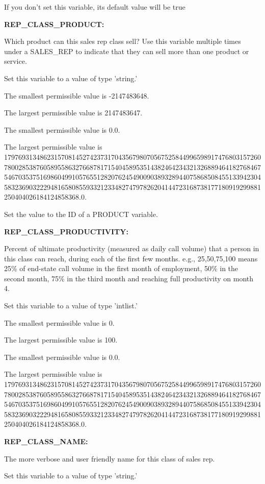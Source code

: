 If you don't set this variable, its default value will be true


\textbf{REP\_CLASS\_PRODUCT:}


Which product can this sales rep class sell?  Use this variable multiple times under a SALES\_REP to indicate that they can sell more than one product or service.

Set this variable to a value of type 'string.'

The smallest permissible value is -2147483648.

The largest permissible value is 2147483647.

The smallest permissible value is 0.0.

The largest permissible value is 179769313486231570814527423731704356798070567525844996598917476803157260780028538760589558632766878171540458953514382464234321326889464182768467546703537516986049910576551282076245490090389328944075868508455133942304583236903222948165808559332123348274797826204144723168738177180919299881250404026184124858368.0.

Set the value to the ID of a PRODUCT variable.


\textbf{REP\_CLASS\_PRODUCTIVITY:}


Percent of ultimate productivity (measured as daily call volume) that a person in this class can reach, during each of the first few months.  e.g., 25,50,75,100 means 25\% of end-state call volume in the first month of employment, 50\% in the second month, 75\% in the third month and reaching full productivity on month 4.

Set this variable to a value of type 'intlist.'

The smallest permissible value is 0.

The largest permissible value is 100.

The smallest permissible value is 0.0.

The largest permissible value is 179769313486231570814527423731704356798070567525844996598917476803157260780028538760589558632766878171540458953514382464234321326889464182768467546703537516986049910576551282076245490090389328944075868508455133942304583236903222948165808559332123348274797826204144723168738177180919299881250404026184124858368.0.


\textbf{REP\_CLASS\_NAME:}


The more verbose and user friendly name for this class of sales rep.

Set this variable to a value of type 'string.'

